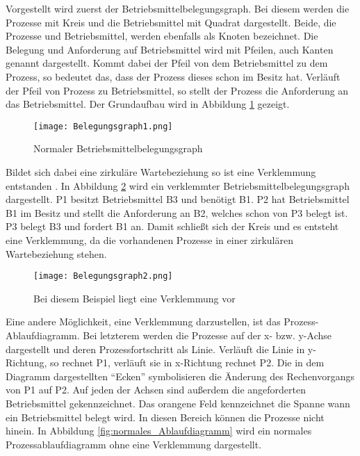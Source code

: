 Vorgestellt wird zuerst der Betriebsmittelbelegungsgraph. Bei diesem werden die Prozesse mit Kreis und die Betriebsmittel mit Quadrat dargestellt. Beide, die Prozesse und Betriebsmittel, werden ebenfalls als Knoten bezeichnet. Die Belegung und Anforderung auf Betriebsmittel wird mit Pfeilen, auch Kanten genannt dargestellt. Kommt dabei der Pfeil von dem Betriebsmittel zu dem Prozess, so bedeutet das, dass der Prozess dieses schon im Besitz hat. Verläuft der Pfeil von Prozess zu Betriebsmittel, so stellt der Prozess die Anforderung an das Betriebsmittel. Der Grundaufbau wird in Abbildung \ref{fig:normaler_betriebsmittelbelegungsgraph} gezeigt.

\begin{figure}[h]
\caption{Normaler Betriebsmittelbelegungsgraph}
\label{fig:normaler_betriebsmittelbelegungsgraph}
\centering
\texttt{[image: Belegungsgraph1.png]}
\end{figure}

Bildet sich dabei eine zirkuläre Wartebeziehung so ist eine Verklemmung entstanden \parencite[vgl.][S. 197]{baun2017}.  In Abbildung \ref{fig:verklemmter_betriebsmittelbelegungsgraph} wird ein verklemmter Betriebsmittelbelegungsgraph dargestellt.
P1 besitzt Betriebsmittel B3 und benötigt B1. P2 hat Betriebsmittel B1 im Besitz und stellt die Anforderung an B2, welches schon von P3 belegt ist. P3 belegt B3 und fordert B1 an. Damit schließt sich der Kreis und es entsteht eine Verklemmung, da die vorhandenen Prozesse in einer zirkulären Wartebeziehung stehen.

\begin{figure}[H]
\caption{Bei diesem Beispiel liegt eine Verklemmung vor}
\label{fig:verklemmter_betriebsmittelbelegungsgraph}
\centering
\texttt{[image: Belegungsgraph2.png]}
\end{figure}

Eine andere Möglichkeit, eine Verklemmung darzustellen, ist das Prozess-Ablaufdiagramm. Bei letzterem werden die Prozesse auf der x- bzw. y-Achse dargestellt und deren Prozessfortschritt als Linie. Verläuft die Linie in y-Richtung, so rechnet P1, verläuft sie in x-Richtung rechnet P2. Die in dem Diagramm dargestellten ``Ecken'' symbolisieren die Änderung des Rechenvorgangs von P1 auf P2. Auf jeden der Achsen sind außerdem die angeforderten Betriebsmittel gekennzeichnet. Das orangene Feld kennzeichnet die Spanne wann ein Betriebsmittel belegt wird. In diesen Bereich können die Prozesse nicht hinein.
In Abbildung \ref{fig:normales_Ablaufdiagramm} wird ein normales Prozessablaufdiagramm ohne eine Verklemmung dargestellt.

